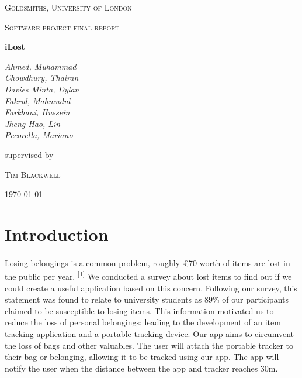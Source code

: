 \documentclass[12pt,a4paper]{article}
\begin{document}
    \begin{titlepage}
      \centering
      {\scshape\LARGE Goldsmiths, University of London \par}
      \vspace{1cm}
      {\scshape\Large Software project final report\par}
      \vspace{1.5cm}
      {\huge\bfseries iLost\par}
      \vspace{2cm}
      {\Large\itshape 
        Ahmed, Muhammad\\
        Chowdhury, Thairan\\
        Davies Minta, Dylan\\     
        Fakrul, Mahmudul\\    
        Farkhani, Hussein\\ 
        Jheng-Hao, Lin\\
        Pecorella, Mariano\\ \par}
      \vfill
      supervised by \par
      \textsc{Tim Blackwell} 
      \vfill
      {\large \today \par}
    \end{titlepage}
    \tableofcontents
    \newpage
    \section{Introduction}
      \paragraph{} Losing belongings is a common problem, roughly £70 worth of items are lost in the public per year. \textsuperscript{[1]} We conducted a survey about lost items to find out if we could create a useful application based on this concern. Following our survey, this statement was found to relate to university students as 89\% of our participants claimed to be susceptible to losing items. This information motivated us to reduce the loss of personal belongings; leading to the development of an item tracking application and a portable tracking device. Our app aims to circumvent the loss of bags and other valuables. The user will attach the portable tracker to their bag or belonging, allowing it to be tracked using our app. The app will notify the user when the distance between the app and tracker reaches 30m.
      
\end{document}
